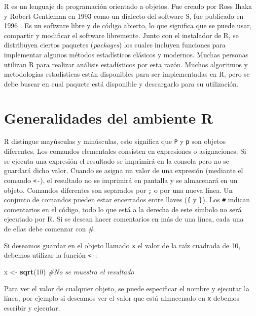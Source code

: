 \documentclass[]{book}
\newenvironment{Shaded}{\begin{snugshade}}{\end{snugshade}}
\newcommand{\KeywordTok}[1]{\textcolor[rgb]{0.13,0.29,0.53}{\textbf{#1}}}
\newcommand{\DecValTok}[1]{\textcolor[rgb]{0.00,0.00,0.81}{#1}}
\newcommand{\StringTok}[1]{\textcolor[rgb]{0.31,0.60,0.02}{#1}}
\newcommand{\CommentTok}[1]{\textcolor[rgb]{0.56,0.35,0.01}{\textit{#1}}}
\newcommand{\NormalTok}[1]{#1}
\begin{document}
R \citep{R-base} es un lenguaje de programación orientado a objetos. Fue
creado por Ross Ihaka y Robert Gentleman en 1993 como un dialecto del
software S, fue publicado en 1996 \citep{ihaka1996r}. Es un software
libre y de código abierto, lo que significa que se puede usar, compartir
y modificar el software libremente. Junto con el instalador de R, se
distribuyen ciertos paquetes (\emph{packages}) los cuales incluyen
funciones para implementar algunos métodos estadísticos clásicos y
modernos. Muchas personas utilizan R para realizar análisis estadísticos
por esta razón. Muchos algoritmos y metodologías estadísticas están
disponibles para ser implementadas en R, pero se debe buscar en cual
paquete está disponible y descargarlo para su utilización.

\hypertarget{SintaxisBasica}{%
\section{Generalidades del ambiente R}\label{SintaxisBasica}}

R distingue mayúsculas y minúsculas, esto significa que \texttt{P} y
\texttt{p} son objetos diferentes. Los comandos elementales consisten en
expresiones o asignaciones. Si se ejecuta una expresión el resultado se
imprimirá en la consola pero no se guardará dicho valor. Cuando se
asigna un valor de una expresión (mediante el comando
\texttt{\textless{}-}), el resultado no se imprimirá en pantalla y se
almacenará en un objeto. Comandos diferentes son separados por
\texttt{;} o por una nueva línea. Un conjunto de comandos pueden estar
encerrados entre llaves (\texttt{\{} y \texttt{\}}). Los \texttt{\#}
indican comentarios en el código, todo lo que está a la derecha de este
símbolo no será ejecutado por R. Si se desean hacer comentarios en más
de una línea, cada una de ellas debe comenzar con \#.

Si deseamos guardar en el objeto llamado \texttt{x} el valor de la raíz
cuadrada de 10, debemos utilizar la función \texttt{\textless{}-}:

\begin{Shaded}
\begin{Highlighting}[]
\NormalTok{x <-}\StringTok{ }\KeywordTok{sqrt}\NormalTok{(}\DecValTok{10}\NormalTok{) }\CommentTok{#No se muestra el resultado}
\end{Highlighting}
\end{Shaded}

Para ver el valor de cualquier objeto, se puede especificar el nombre y
ejecutar la línea, por ejemplo si deseamos ver el valor que está
almacenado en \texttt{x} debemos escribir y ejecutar:
\end{document}
